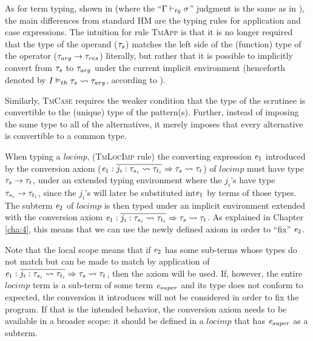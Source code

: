 As for term typing, shown in  (where the ``$\Gamma \vdash_{ty} \mathit{\sigma}$'' judgment is the same as in ), the main differences from standard HM are the typing rules for application and case expressions. The intuition for rule \textsc{TmApp} is that it is no longer required that the type of the operand ($\mathit{\tau}_s$) matches the left side of the (function) type of the operator ($\mathit{\tau}_{arg} \to \mathit{\tau}_{res}$) literally, but rather that it is possible to implicitly convert from $\mathit{\tau}_s$ to $\mathit{\tau}_{arg}$ under the current implicit environment (henceforth denoted by ${I} \vDash_{th} {\mathit{\tau}_s}\rightsquigarrow {\mathit{\tau}_{arg}}$, according to ).

Similarly, \textsc{TmCase} requires the weaker condition that the type of the scrutinee is convertible to the (unique) type of the pattern(s). Further, instead of imposing the same type to all of the alternatives, it merely imposes that every alternative is convertible to a common type.

When typing a \textit{locimp}, (\textsc{TmLocImp} rule) the converting expression $\mathit{e}_{1}$ introduced by the conversion axiom ($ \mathit{e}_{1} : \overline{j_i : \mathit{\tau}_{s_i} \rightsquigarrow \mathit{\tau}_{t_i}} \Rightarrow \mathit{\tau}_{s} \rightsquigarrow \mathit{\tau}_{t}$) of $locimp$ must have type $\mathit{\tau}_{s} \to \mathit{\tau}_{t}$, under an extended typing environment where the $j_i$'s have type $\mathit{\tau}_{s_i} \to \mathit{\tau}_{t_i}$, since the $j_i$'s will later be substituted int$\mathit{e}_1$ by terms of those types. The subterm $\mathit{e}_2$ of $locimp$ is then typed under an implicit environment extended with the conversion axiom $ \mathit{e}_{1} : \overline{j_i : \mathit{\tau}_{s_i} \rightsquigarrow \mathit{\tau}_{t_i}} \Rightarrow \mathit{\tau}_{s} \rightsquigarrow \mathit{\tau}_{t}$. As explained in Chapter \ref{cha:4}, this means that we can use the newly defined axiom in order to ``fix'' $\mathit{e}_2$.

Note that the local scope means that if $\mathit{e}_2$ has some sub-terms whose types do not match but can be made to match by application of $ \mathit{e}_{1} : \overline{j_i : \mathit{\tau}_{s_i} \rightsquigarrow \mathit{\tau}_{t_i}} \Rightarrow \mathit{\tau}_{s} \rightsquigarrow \mathit{\tau}_{t}$, then the axiom will be used. If, however, the entire $locimp$ term is a sub-term of some term $\mathit{e}_{super}$ and its type does not conform to expected, the conversion it introduces will not be considered in order to fix the program. If that is the intended behavior, the conversion axiom needs to be available in a broader scope: it should be defined in a $locimp$ that has $\mathit{e}_{super}$ as a subterm.

